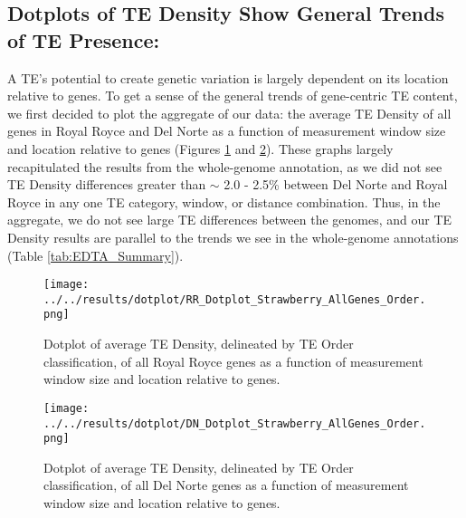 \documentclass[fleqn,10pt]{olplainarticle}
\begin{document}
\subsection*{Dotplots of TE Density Show General Trends of TE Presence:}
A TE's potential to create genetic variation is largely dependent on its location relative to genes.
To get a sense of the general trends of gene-centric TE content, we first decided to plot the aggregate of our data: the average TE Density of all genes in Royal Royce and Del Norte as a function of measurement window size and location relative to genes (Figures \ref{fig:RR_order_dotplot} and \ref{fig:DN_order_dotplot}).
These graphs largely recapitulated the results from the whole-genome annotation, as we did not see TE Density differences greater than $\sim$ 2.0 - 2.5\% between Del Norte and Royal Royce in any one TE category, window, or distance combination.
Thus, in the aggregate, we do not see large TE differences between the genomes, and our TE Density results are parallel to the trends we see in the whole-genome annotations (Table \ref{tab:EDTA_Summary}).


\begin{figure}[ht]
\centering
\texttt{[image: ../../results/dotplot/RR\_Dotplot\_Strawberry\_AllGenes\_Order.png]}
\caption{Dotplot of average TE Density, delineated by TE Order classification, of all Royal Royce genes as a function of measurement window size and location relative to genes.}
\label{fig:RR_order_dotplot}
\end{figure}

\begin{figure}[ht]
\centering
\texttt{[image: ../../results/dotplot/DN\_Dotplot\_Strawberry\_AllGenes\_Order.png]}
\caption{Dotplot of average TE Density, delineated by TE Order classification, of all Del Norte genes as a function of measurement window size and location relative to genes.}
\label{fig:DN_order_dotplot}
\end{figure}
\end{document}
